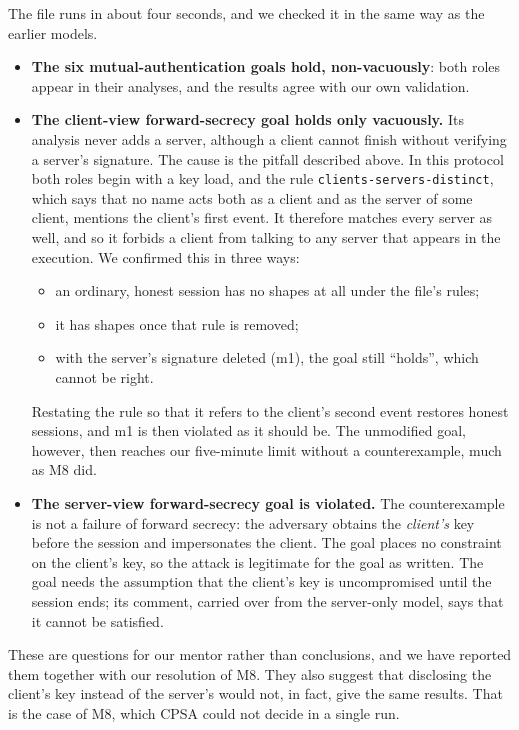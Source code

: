 \documentclass[11pt]{article}
\begin{document}
The file runs in about four seconds, and we checked it in the same way as the earlier models.
\begin{itemize}
    \item \textbf{The six mutual-authentication goals hold, non-vacuously}: both roles appear in their analyses, and the results agree with our own validation.
    \item \textbf{The client-view forward-secrecy goal holds only vacuously.} Its analysis never adds a server, although a client cannot finish without verifying a server's signature. The cause is the pitfall described above. In this protocol both roles begin with a key load, and the rule \texttt{clients-servers-distinct}, which says that no name acts both as a client and as the server of some client, mentions the client's first event. It therefore matches every server as well, and so it forbids a client from talking to any server that appears in the execution. We confirmed this in three ways:
    \begin{itemize}
        \item an ordinary, honest session has no shapes at all under the file's rules;
        \item it has shapes once that rule is removed;
        \item with the server's signature deleted (m1), the goal still ``holds'', which cannot be right.
    \end{itemize}
    Restating the rule so that it refers to the client's second event restores honest sessions, and m1 is then violated as it should be. The unmodified goal, however, then reaches our five-minute limit without a counterexample, much as M8 did.
    \item \textbf{The server-view forward-secrecy goal is violated.} The counterexample is not a failure of forward secrecy: the adversary obtains the \textit{client's} key before the session and impersonates the client. The goal places no constraint on the client's key, so the attack is legitimate for the goal as written. The goal needs the assumption that the client's key is uncompromised until the session ends; its comment, carried over from the server-only model, says that it cannot be satisfied.
\end{itemize}

These are questions for our mentor rather than conclusions, and we have reported them together with our resolution of M8. They also suggest that disclosing the client's key instead of the server's would not, in fact, give the same results. That is the case of M8, which CPSA could not decide in a single run.
\end{document}
